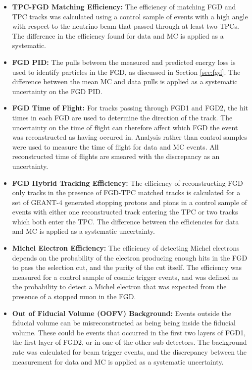 \begin{itemize}
\item \textbf{TPC-FGD Matching Efficiency:} The efficiency of matching FGD and TPC tracks was calculated using a control sample of events with a high angle with respect to the neutrino beam that passed through at least two TPCs. The difference in the efficiency found for data and MC is applied as a systematic.

\item \textbf{FGD PID:} The pulls between the measured and predicted energy loss is used to identify particles in the FGD, as discussed in Section \ref{sec:fgd}. The difference between the mean MC and data pulls is applied as a systematic uncertainty on the FGD PID.

\item \textbf{FGD Time of Flight:} For tracks passing through FGD1 and FGD2, the hit times in each FGD are used to determine the direction of the track. The uncertainty on the time of flight can therefore affect which FGD the event was reconstructed as having occured in. Analysis rather than control samples were used to measure the time of flight for data and MC events. All reconstructed time of flights are smeared with the discrepancy as an uncertainty.

\item \textbf{FGD Hybrid Tracking Efficiency:} The efficiency of reconstructing FGD-only tracks in the presence of FGD-TPC matched tracks is calculated for a set of GEANT-4 generated stopping protons and pions in a control sample of events with either one reconstructed track entering the TPC or two tracks which both enter the TPC. The difference between the efficiencies for data and MC is applied as a systematic uncertainty.

\item \textbf{Michel Electron Efficiency:} The efficiency of detecting Michel electrons depends on the probability of the electron producing enough hits in the FGD to pass the selection cut, and the purity of the cut itself. The efficiency was measured for a control sample of cosmic trigger events, and was defined as the probability to detect a Michel electron that was expected from the presence of a stopped muon in the FGD.

\item \textbf{Out of Fiducial Volume (OOFV) Background:} Events outside the fiducial volume can be misreconstructed as being being inside the fiducial volume. These could be events that occurred in the first two layers of FGD1, the first layer of FGD2, or in one of the other sub-detectors. The background rate was calculated for beam trigger events, and the discrepancy between the measurement for data and MC is applied as a systematic uncertainty.


\end{itemize}
